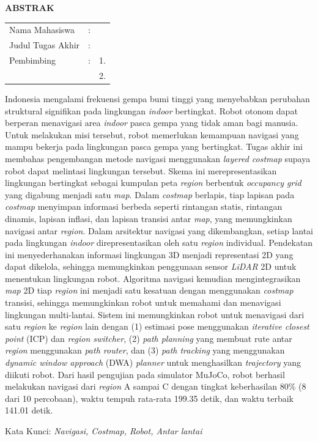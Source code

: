 \begin{center}
  \large\textbf{ABSTRAK}
\end{center}


\vspace{2ex}

\begingroup
\setlength{\tabcolsep}{0pt}

\noindent
\begin{tabularx}{\textwidth}{l >{\centering}m{2em} X}
  Nama Mahasiswa    & : & \name{}         \\

  Judul Tugas Akhir & : & \tatitle{}      \\

  Pembimbing        & : & 1. \advisor{}   \\
                    &   & 2. \coadvisor{} \\
\end{tabularx}
\endgroup

Indonesia mengalami frekuensi gempa bumi tinggi yang menyebabkan perubahan
struktural signifikan pada lingkungan \emph{indoor} bertingkat. Robot otonom
dapat berperan menavigasi area \emph{indoor} pasca gempa yang tidak aman
bagi manusia. Untuk melakukan misi tersebut, robot memerlukan kemampuan
navigasi yang mampu bekerja pada lingkungan pasca gempa yang bertingkat.
Tugas akhir ini membahas pengembangan metode navigasi menggunakan \emph{layered
costmap} supaya robot dapat melintasi lingkungan tersebut. Skema ini
merepresentasikan lingkungan bertingkat sebagai kumpulan peta \emph{region}
berbentuk \emph{occupancy grid} yang digabung menjadi satu \emph{map}. Dalam
\emph{costmap} berlapis, tiap lapisan pada \emph{costmap} menyimpan informasi
berbeda seperti rintangan statis, rintangan dinamis, lapisan inflasi, dan
lapisan transisi antar \emph{map}, yang memungkinkan navigasi antar
\emph{region}. Dalam arsitektur navigasi yang dikembangkan, setiap lantai pada
lingkungan \emph{indoor} direpresentasikan oleh satu \emph{region} individual.
Pendekatan ini menyederhanakan informasi lingkungan 3D menjadi representasi 2D
yang dapat dikelola, sehingga memungkinkan penggunaan sensor \emph{LiDAR} 2D
untuk menentukan lingkungan robot. Algoritma navigasi kemudian mengintegrasikan
\emph{map} 2D tiap \emph{region} ini menjadi satu kesatuan dengan menggunakan
\emph{costmap} transisi, sehingga memungkinkan robot untuk memahami dan
menavigasi lingkungan multi-lantai. Sistem ini memungkinkan robot untuk
menavigasi dari satu \emph{region} ke \emph{region} lain dengan (1) estimasi
pose menggunakan \emph{iterative closest point} (ICP) dan \emph{region
switcher}, (2) \emph{path planning} yang membuat rute antar \emph{region}
menggunakan \emph{path router}, dan (3) \emph{path tracking} yang menggunakan
\emph{dynamic window approach} (DWA) \emph{planner} untuk menghasilkan
\emph{trajectory} yang diikuti robot.
Dari hasil pengujian pada simulator MuJoCo, robot berhasil melakukan navigasi
dari \emph{region} A sampai C dengan tingkat keberhasilan 80\% (8 dari 10
percobaan), waktu tempuh rata-rata 199.35 detik, dan waktu terbaik 141.01
detik.

Kata Kunci:  \emph{Navigasi, Costmap, Robot, Antar lantai}
